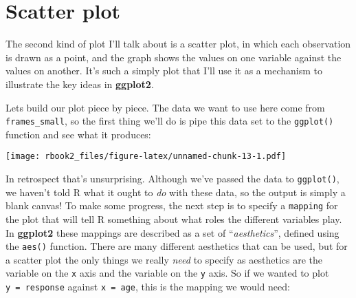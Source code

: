 \documentclass[]{book}
\newenvironment{Shaded}{\begin{snugshade}}{\end{snugshade}}
\newcommand{\DataTypeTok}[1]{\textcolor[rgb]{0.13,0.29,0.53}{#1}}
\newcommand{\KeywordTok}[1]{\textcolor[rgb]{0.13,0.29,0.53}{\textbf{#1}}}
\newcommand{\NormalTok}[1]{#1}
\newcommand{\OperatorTok}[1]{\textcolor[rgb]{0.81,0.36,0.00}{\textbf{#1}}}
\newcommand{\StringTok}[1]{\textcolor[rgb]{0.31,0.60,0.02}{#1}}
\begin{document}
\hypertarget{scatter-plot}{%
\section{Scatter plot}\label{scatter-plot}}

The second kind of plot I'll talk about is a scatter plot, in which each observation is drawn as a point, and the graph shows the values on one variable against the values on another. It's such a simply plot that I'll use it as a mechanism to illustrate the key ideas in \textbf{ggplot2}.

Lets build our plot piece by piece. The data we want to use here come from \texttt{frames\_small}, so the first thing we'll do is pipe this data set to the \texttt{ggplot()} function and see what it produces:

\begin{Shaded}
\end{Shaded}

\texttt{[image: rbook2\_files/figure-latex/unnamed-chunk-13-1.pdf]}

In retrospect that's unsurprising. Although we've passed the data to \texttt{ggplot()}, we haven't told R what it ought to \emph{do} with these data, so the output is simply a blank canvas! To make some progress, the next step is to specify a \texttt{mapping} for the plot that will tell R something about what roles the different variables play. In \textbf{ggplot2} these mappings are described as a set of ``\emph{aesthetics}'', defined using the \texttt{aes()} function. There are many different aesthetics that can be used, but for a scatter plot the only things we really \emph{need} to specify as aesthetics are the variable on the \texttt{x} axis and the variable on the \texttt{y} axis. So if we wanted to plot \texttt{y\ =\ response} against \texttt{x\ =\ age}, this is the mapping we would need:

\begin{Shaded}
\end{Shaded}
\end{document}

